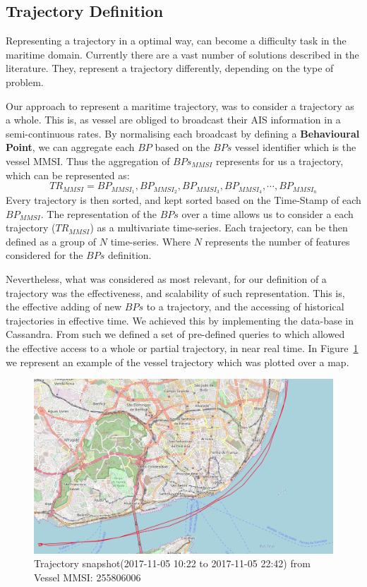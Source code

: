 \subsection{Trajectory Definition}
\label{subsection: Trajectory Definition}
Representing a trajectory in a optimal way, can become a difficulty task in the maritime domain. Currently there are a vast number of solutions described in the literature. They, represent a trajectory differently, depending on the type of problem.

Our approach to represent a maritime trajectory, was to consider a trajectory as a whole. This is, as vessel are obliged to broadcast their AIS information in a semi-continuous rates. By normalising each broadcast by defining a \textbf{Behavioural Point}, we can aggregate each $BP$ based on the $BPs$ vessel identifier which is the vessel MMSI. Thus the aggregation of $BPs_{MMSI}$ represents for us a trajectory, which can be represented as:
\[TR_{MMSI} = BP_{MMSI_1}, BP_{MMSI_2}, BP_{MMSI_3}, BP_{MMSI_4}, \cdots , BP_{MMSI_n}\]
Every trajectory is then sorted, and kept sorted based on the Time-Stamp of each $BP_{MMSI}$. The representation of the $BPs$ over a time allows us to consider a each trajectory ($TR_{MMSI}$) as a multivariate time-series.
Each trajectory, can be then defined as a group of $N$ time-series. Where $N$ represents the number of features considered for the $BPs$ definition.

Nevertheless, what was considered as most relevant, for our definition of a trajectory was the effectiveness, and scalability of such representation. This is, the effective adding of new $BPs$ to a trajectory, and the accessing of historical trajectories in effective time. We achieved this by implementing the data-base in Cassandra. From such we defined a set of pre-defined queries to which allowed the effective access to a whole or partial trajectory, in near real time.
In Figure~\ref{fig: TrajectorySMM_example} we represent an example of the vessel trajectory which was plotted over a map. 

\begin{figure}[H]
\centering
\includegraphics[width=\textwidth]{figures/Ch3/traj_example.png}
\caption{Trajectory snapshot(2017-11-05 10:22 to 2017-11-05 22:42) from Vessel MMSI: 255806006}
\label{fig: TrajectorySMM_example}
\end{figure}

